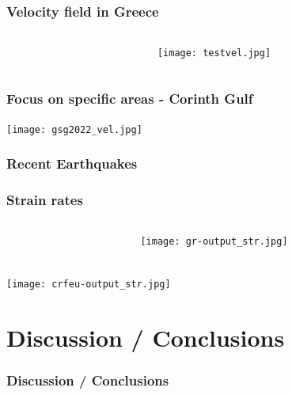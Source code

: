 \begin{frame}
  \frametitle{Velocity field in Greece}
  \framesubtitle{}
  \label{}
  \vskip-1cm
\begin{columns}[T]
  \begin{column}{.3\textwidth}

  \end{column}
  \begin{column}{.7\textwidth}
    \texttt{[image: testvel.jpg]}
  \end{column}
\end{columns}
\end{frame}
\note{}

\begin{frame}
  \frametitle{Focus on specific areas - Corinth Gulf}
  \framesubtitle{}
  \label{}
  
  \begin{center}
    \texttt{[image: gsg2022\_vel.jpg]}  
  \end{center}

\end{frame}
\note{}

\begin{frame}
  \frametitle{Recent Earthquakes}
  \framesubtitle{}
  \label{}

\end{frame}
\note{}

\begin{frame}
  \frametitle{Strain rates}
  \framesubtitle{}
  \label{}
  \vskip-1cm
\begin{columns}[T]
  \begin{column}{.3\textwidth}

  \end{column}
  \begin{column}{.7\textwidth}
      \texttt{[image: gr-output\_str.jpg]}
  \end{column}
\end{columns}
\end{frame}
\note{}

\begin{frame}
  \frametitle{}
  \framesubtitle{}
  \label{}

\begin{center}
  \texttt{[image: crfeu-output\_str.jpg]}
\end{center}

\end{frame}
\note{}





\section{Discussion / Conclusions}
\begin{frame}
  \frametitle{Discussion / Conclusions}
  \framesubtitle{}
  \label{}

\end{frame}
\note{}

